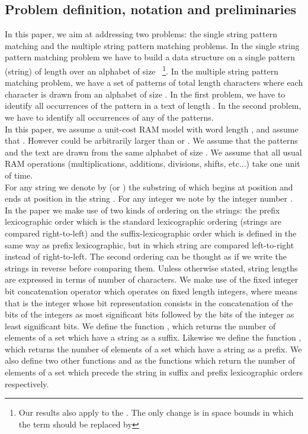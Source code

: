 \documentclass{article}
\newcommand{\?}{\mskip1.5mu}
\begin{document}
\subsection{Problem definition, notation and preliminaries}
In this paper, we aim at addressing two problems: the single string pattern matching and the multiple string pattern matching problems. In the single string pattern matching problem we have to build a data structure on a single pattern (string) of length  over an alphabet of size ~\footnote{Our results also apply to the . The only change is in space bounds in which the term  should be replaced by }. In the multiple string pattern matching problem, we have a set  of  patterns of total length  characters where each character is drawn from an alphabet of size . In the first problem, we have to identify all occurrences of the pattern in a text  of length . In the second problem, we have to identify all occurrences of any of the  patterns. 
\\
In this paper, we assume a unit-cost RAM model with word length , and assume that . However  could be arbitrarily larger than  or . We assume that the patterns and the text are drawn from the same alphabet  of size . We assume that all usual RAM operations (multiplications, additions, divisions, shifts, etc...) take one unit of time. 
\\For any string  we denote by  (or ) the substring of  which begins at position  and ends at position  in the string . 
For any integer  we note by  the integer number .
\\
In the paper we make use of two kinds of ordering on the strings: the prefix lexicographic order which is the standard lexicographic ordering (strings are compared right-to-left) and the suffix-lexicographic order which is defined in the same way as prefix lexicographic, but in which string are compared left-to-right instead of right-to-left. The second ordering can be thought as if we write the strings in reverse before comparing them. Unless otherwise stated, string lengths are expressed in terms of number of characters. We make use of the fixed integer bit concatenation operator  which operates on fixed length integers, where  means that  is the integer whose bit representation consists in the concatenation of the bits of the integers  as most significant bits followed by the bits of the integer  as least significant bits. 
We define the function , which returns the number of elements of a set  which have a string  as a suffix. Likewise we define the function , which returns the number of elements of a set  which have a string  as a prefix. 
We also define two other functions  and  as the functions which return the number of elements of a set  which precede the string  in suffix and prefix lexicographic orders respectively.
\end{document}
